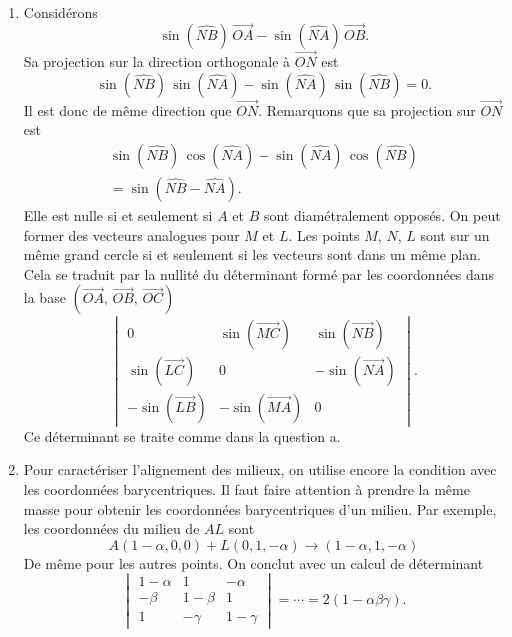 \begin{enumerate}
  \item Considérons
\begin{displaymath}
  \sin (\widehat{NB})\, \overrightarrow{OA} - \sin (\widehat{NA})\, \overrightarrow{OB}.
\end{displaymath}
Sa projection sur la direction orthogonale à $\overrightarrow{ON}$ est
\begin{displaymath}
  \sin (\widehat{NB})\, \sin (\widehat{NA}) - \sin (\widehat{NA})\, \sin (\widehat{NB})=0.
\end{displaymath}
Il est donc de même direction que $\overrightarrow{ON}$.\newline
Remarquons que sa projection sur $\overrightarrow{ON}$ est
\begin{multline*}
  \sin (\widehat{NB})\, \cos (\widehat{NA}) - \sin (\widehat{NA})\, \cos (\widehat{NB})\\
  = \sin \left( \widehat{NB} - \widehat{NA}\right).
\end{multline*}
Elle est nulle si et seulement si $A$ et $B$ sont diamétralement opposés.\newline
On peut former des vecteurs analogues pour $M$ et $L$. Les points $M$, $N$, $L$ sont sur un même grand cercle si et seulement si les vecteurs sont dans un même plan. Cela se traduit par la nullité du déterminant formé par les coordonnées dans la base $\left( \overrightarrow{OA}, \,\overrightarrow{OB}, \,\overrightarrow{OC}\right)$
\begin{displaymath}
  \begin{vmatrix}
    0                          & \sin(\overrightarrow{MC})  & \sin(\overrightarrow{NB}) \\ 
    \sin(\overrightarrow{LC})  & 0                          & -\sin(\overrightarrow{NA})  \\
    -\sin(\overrightarrow{LB}) & -\sin(\overrightarrow{MA}) & 0 
  \end{vmatrix}
.
\end{displaymath}
Ce déterminant se traite comme dans la question a.

  \item Pour caractériser l'alignement des milieux, on utilise encore la condition avec les coordonnées barycentriques. Il faut faire attention à prendre la même masse pour obtenir les coordonnées barycentriques d'un milieu. Par exemple, les coordonnées du milieu de $AL$ sont
\begin{displaymath}
  A (1-\alpha,0,0) + L(0,1,-\alpha) \rightarrow (1-\alpha, 1, -\alpha)
\end{displaymath}
De même pour les autres points. On conclut avec un calcul de déterminant
\begin{displaymath}
\begin{vmatrix}
  1- \alpha & 1       & -\alpha \\
  -\beta    & 1-\beta & 1 \\
  1         & -\gamma & 1-\gamma
\end{vmatrix}
= \cdots = 2(1-\alpha \beta \gamma).
\end{displaymath}


\end{enumerate}

